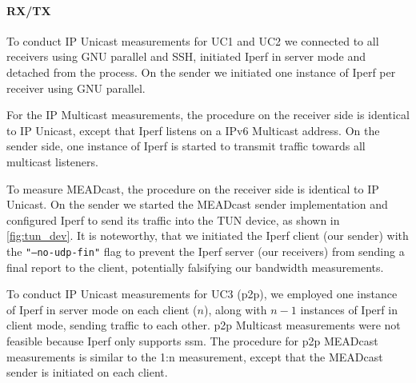 \paragraph{RX/TX} %
\label{par:RX/TX}
To conduct IP Unicast measurements for UC1 and UC2 we connected to all
    receivers using GNU parallel and SSH, initiated Iperf in server mode and
    detached from the process.
On the sender we initiated one instance of Iperf per receiver using GNU
    parallel.

For the IP Multicast measurements, the procedure on the receiver side is
    identical to IP Unicast, except that Iperf listens on a IPv6 Multicast
    address.
On the sender side, one instance of Iperf is started to transmit traffic
    towards all multicast listeners.

To measure MEADcast, the procedure on the receiver side is identical to IP
    Unicast.
On the sender we started the MEADcast sender implementation and configured
    Iperf to send its traffic into the TUN device, as shown in
    \autoref{fig:tun_dev}.
It is noteworthy, that we initiated the Iperf client (our sender) with the
    \texttt{"--no-udp-fin"} flag to prevent the Iperf server (our receivers)
    from sending a final report to the client, potentially falsifying our
    bandwidth measurements.

To conduct IP Unicast measurements for UC3 (\gls{p2p}), we employed one
    instance of Iperf in server mode on each client ($n$), along with $n-1$
    instances of Iperf in client mode, sending traffic to each other.
\gls{p2p} Multicast measurements were not feasible because Iperf only supports
    \gls{ssm}.
The procedure for \gls{p2p} MEADcast measurements is similar to the 1:n
    measurement, except that the MEADcast sender is initiated on each client.

